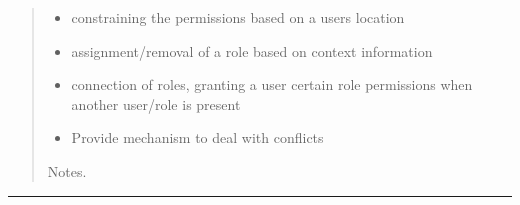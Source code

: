 \documentclass[letterpaper,10pt,english]{sphinxmanual}
\begin{document}
\begin{quote}
\begin{description}
\begin{itemize}
\item {} 
constraining the permissions based on a users location

\item {} 
assignment/removal of a role based on context information

\item {} 
connection of roles, granting a user certain role permissions when another user/role is present

\item {} 
Provide mechanism to deal with conflicts

\end{itemize}

\end{description}

Notes.
\end{quote}


\bigskip\hrule{}\bigskip
\end{document}
